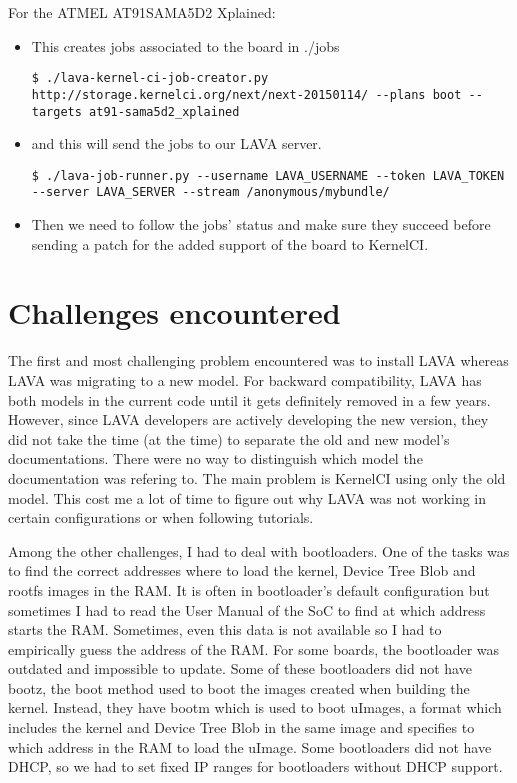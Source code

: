 For the ATMEL AT91SAMA5D2 Xplained:
\begin{itemize}
  \item This creates jobs associated to the board in ./jobs

\begin{verbatim}
$ ./lava-kernel-ci-job-creator.py http://storage.kernelci.org/next/next-20150114/ --plans boot --targets at91-sama5d2_xplained
\end{verbatim}

  \item and this will send the jobs to our LAVA server.

\begin{verbatim}
$ ./lava-job-runner.py --username LAVA_USERNAME --token LAVA_TOKEN --server LAVA_SERVER --stream /anonymous/mybundle/
\end{verbatim}

  \item Then we need to follow the jobs' status and make sure they succeed before sending a patch for the added support of the board to KernelCI.
\end{itemize}

\section{Challenges encountered}
The first and most challenging problem encountered was to install LAVA whereas LAVA was migrating to a new model. For backward compatibility, LAVA has both models in the current code until it gets definitely removed in a few years. However, since LAVA developers are actively developing the new version, they did not take the time (at the time) to separate the old and new model's documentations. There were no way to distinguish which model the documentation was refering to. The main problem is KernelCI using only the old model. This cost me a lot of time to figure out why LAVA was not working in certain configurations or when following tutorials.

Among the other challenges, I had to deal with bootloaders. One of the tasks was to find the correct addresses where to load the kernel, Device Tree Blob and rootfs images in the RAM. It is often in bootloader's default configuration but sometimes I had to read the User Manual of the SoC to find at which address starts the RAM. Sometimes, even this data is not available so I had to empirically guess the address of the RAM. For some boards, the bootloader was outdated and impossible to update. Some of these bootloaders did not have bootz, the boot method used to boot the images created when building the kernel. Instead, they have bootm which is used to boot uImages, a format which includes the kernel and Device Tree Blob in the same image and specifies to which address in the RAM to load the uImage. Some bootloaders did not have DHCP, so we had to set fixed IP ranges for bootloaders without DHCP support.

